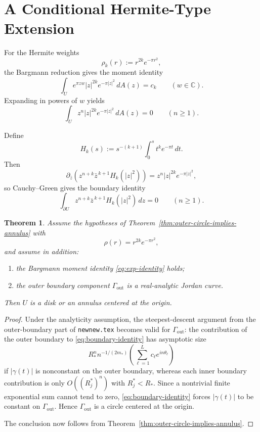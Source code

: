 \documentclass[11pt]{article}
\newtheorem{theorem}{Theorem}[section]
\newcommand{\C}{\mathbb C}
\newcommand{\1}{\mathbf 1}
\newcommand{\pb}{\partial_{\bar z}}
\begin{document}
\section{A Conditional Hermite-Type Extension}

For the Hermite weights
\[
\rho_k(r):=r^{2k}e^{-\pi r^2},
\]
the Bargmann reduction gives the moment identity
\begin{equation}\label{eq:exp-identity}
\int_U e^{\pi zw}|z|^{2k}e^{-\pi |z|^2}\,dA(z)=c_k
\qquad (w\in \C).
\end{equation}
Expanding in powers of $w$ yields
\[
\int_U z^n |z|^{2k}e^{-\pi |z|^2}\,dA(z)=0
\qquad (n\ge 1).
\]

Define
\[
H_k(s):=s^{-(k+1)}\int_0^s t^k e^{-\pi t}\,dt.
\]
Then
\[
\pb\!\left(z^{n+k}\bar z^{\,k+1}H_k(|z|^2)\right)=z^n|z|^{2k}e^{-\pi|z|^2},
\]
so Cauchy--Green gives the boundary identity
\begin{equation}\label{eq:boundary-identity}
\int_{\partial U} z^{n+k}\bar z^{\,k+1}H_k(|z|^2)\,dz=0
\qquad (n\ge 1).
\end{equation}

\begin{theorem}\label{thm:conditional}
Assume the hypotheses of Theorem~\ref{thm:outer-circle-implies-annulus} with
\[
\rho(r)=r^{2k}e^{-\pi r^2},
\]
and assume in addition:
\begin{enumerate}[label=\textnormal{(\roman*)}]
\item the Bargmann moment identity \eqref{eq:exp-identity} holds;
\item the outer boundary component $\Gamma_{\mathrm{out}}$ is a real-analytic Jordan curve.
\end{enumerate}
Then $U$ is a disk or an annulus centered at the origin.
\end{theorem}

\begin{proof}
Under the analyticity assumption, the steepest-descent argument from the outer-boundary part of
\texttt{newnew.tex} becomes valid for $\Gamma_{\mathrm{out}}$: the contribution of the outer
boundary to \eqref{eq:boundary-identity} has asymptotic size
\[
R_*^n n^{-1/(2m_*)}
\left(\sum_{\ell=1}^L c_\ell e^{in\theta_\ell}\right)
\]
if $|\gamma(t)|$ is nonconstant on the outer boundary, whereas each inner boundary contribution is
only $O((R_j^*)^n)$ with $R_j^*<R_*$. Since a nontrivial finite exponential sum cannot tend to
zero, \eqref{eq:boundary-identity} forces $|\gamma(t)|$ to be constant on
$\Gamma_{\mathrm{out}}$. Hence $\Gamma_{\mathrm{out}}$ is a circle centered at the origin.

The conclusion now follows from Theorem~\ref{thm:outer-circle-implies-annulus}.
\end{proof}
\end{document}
